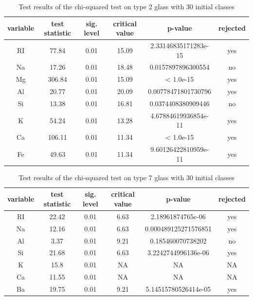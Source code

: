 \documentclass[a4paper, 12pt, titlepage, headsepline, listof = totoc, bibliography = totoc, numbers = noenddot]{scrartcl}
\begin{document}
\begin{appendix}
\begin{table}[h!]
\centering
\begin{tabular}{|cccccc|} \hline variable & test statistic & sig. level & critical value & p-value & rejected\\ \hline RI & 77.84 & 0.01 & 15.09 & 2.33146835171283e-15 & yes\\ 
Na & 17.26 & 0.01 & 18.48 & 0.0157897896300554 & no\\ 
Mg & 306.84 & 0.01 & 15.09 & < 1.0e-15 & yes\\ 
Al & 20.77 & 0.01 & 20.09 & 0.00778471801730796 & yes\\ 
Si & 13.38 & 0.01 & 16.81 & 0.0374408380909446 & no\\ 
K & 54.24 & 0.01 & 13.28 & 4.67884619936854e-11 & yes\\ 
Ca & 106.11 & 0.01 & 11.34 & < 1.0e-15 & yes\\ 
Fe & 49.63 & 0.01 & 11.34 & 9.60126422810959e-11 & yes\\ \hline \end{tabular}\caption{Test results of the chi-squared test on type 2 glass with 30 initial classes}
\label{tab:chi-type2-30}
\end{table}

\begin{table}[h!]
\centering
\begin{tabular}{|cccccc|} \hline variable & test statistic & sig. level & critical value & p-value & rejected\\ \hline RI & 22.42 & 0.01 & 6.63 & 2.18961874765e-06 & yes\\ 
Na & 12.16 & 0.01 & 6.63 & 0.000489125271576851 & yes\\ 
Al & 3.37 & 0.01 & 9.21 & 0.185460070738202 & no\\ 
Si & 21.68 & 0.01 & 6.63 & 3.2242744996136e-06 & yes\\ 
K & 15.8 & 0.01 & NA & NA & NA\\ 
Ca & 11.55 & 0.01 & NA & NA & NA\\ 
Ba & 19.75 & 0.01 & 9.21 & 5.14515780526414e-05 & yes\\ \hline \end{tabular}\caption{Test results of the chi-squared test on type 7 glass with 30 initial classes}
\label{tab:chi-type7-30}
\end{table}

\end{appendix}


\newpage
\listoffigures
\listoftables





\end{document}
